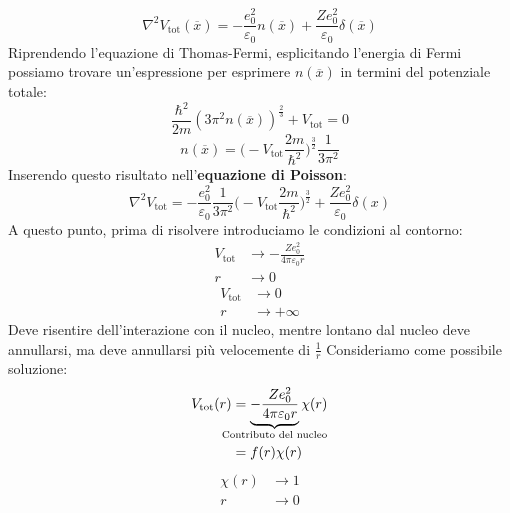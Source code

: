 \begin{equation*}
    \nabla^2V_\text{tot}(\overline x)=-\frac{e_0^2}{\varepsilon_0}n(\overline x)+\frac{Ze_0^2}{\varepsilon_0}\delta(\overline x)
\end{equation*}
Riprendendo l'equazione di Thomas-Fermi, esplicitando l'energia di Fermi possiamo trovare un'espressione per esprimere $n(\overline x)$ in termini del potenziale totale:
\begin{equation*}
    \frac{\hbar^2}{2m}(3\pi^2n(\overline x))^{\frac 23}+V_{\text{tot}}=0
\end{equation*}
\begin{equation*}
    n(\overline x)=\bigg(-V_{\text{tot}}\frac{2m}{\hbar^2}\bigg)^{\frac 32}\frac{1}{3\pi^2}
\end{equation*}
Inserendo questo risultato nell'\textbf{equazione di Poisson}:
\begin{equation*}
    \nabla^2V_{\text{tot}}=-\frac{e_0^2}{\varepsilon_0}\frac{1}{3\pi^2}\bigg(-V_{\text{tot}}\frac{2m}{\hbar^2}\bigg)^{\frac 32}+\frac{Ze_0^2}{\varepsilon_0}\delta(x)
\end{equation*}
A questo punto, prima di risolvere introduciamo le condizioni al contorno:
\begin{equation*}
    \begin{aligned}
    V_{\text{tot}} &\rightarrow - \frac{Ze_0^2}{4\pi\varepsilon_0r}\\
    r &\rightarrow 0
    \end{aligned}
\end{equation*}
\begin{equation*}
    \begin{aligned}
    V_{\text{tot}} &\rightarrow 0\\
    r &\rightarrow +\infty
    \end{aligned}
\end{equation*}
Deve risentire dell'interazione con il nucleo, mentre lontano dal nucleo deve annullarsi, ma deve annullarsi più velocemente di $\frac 1r$
Consideriamo come possibile soluzione:
\begin{equation*}
    \begin{aligned}
        V_{\text{tot}}(r) & =\underbrace{-\frac{Ze_0^2}{4\pi\varepsilon_0r}}_{\mathclap{\text{Contributo del nucleo}}}\chi(r) \\
        & =f(r)\chi(r)
    \end{aligned}
\end{equation*}
\begin{equation*}
    \begin{aligned}
        \chi(r) &\rightarrow  1\\
        r &\rightarrow 0
        \end{aligned}
\end{equation*}
